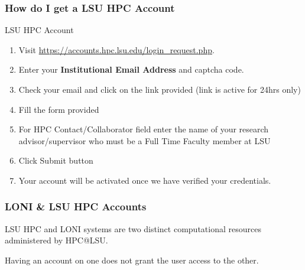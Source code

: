 \documentclass[slidestop,mathserif,compress,xcolor=svgnames,table]{beamer}
\newenvironment{ablock}[0]
{
\begin{beamerboxesrounded}[upper=uppercol,lower=lowercol,shadow=true]}
{\end{beamerboxesrounded}}
\newenvironment{bblock}[0]
{
\begin{beamerboxesrounded}[upper=uppercol1,lower=lowercol1,shadow=true]}
{\end{beamerboxesrounded}}
\begin{document}
\begin{frame}
  \frametitle{\small How do I get a LSU HPC Account}
  \begin{bblock}{LSU HPC Account}
    \begin{enumerate}
      \item Visit \url{https://accounts.hpc.lsu.edu/login_request.php}.
      \item Enter your \textbf{Institutional Email Address} and captcha code.
      \item Check your email and click on the link provided (link is active for 24hrs only)
      \item Fill the form provided
      \item For HPC Contact/Collaborator field enter the name of your research advisor/supervisor who must be a Full Time Faculty member at LSU
      \item Click Submit button
      \item Your account will be activated once we have verified your credentials.
    \end{enumerate}
  \end{bblock}
\end{frame}

\begin{frame}
  \frametitle{\small LONI \& LSU HPC Accounts}
  \begin{ablock}{}
    \begin{itemize}
      {\huge
          \item LSU HPC and LONI systems are two distinct computational resources administered by HPC@LSU.
          \item[]
          \item Having an account on one does not grant the user access to the other.
      }
    \end{itemize}
  \end{ablock}
\end{frame}
\end{document}
